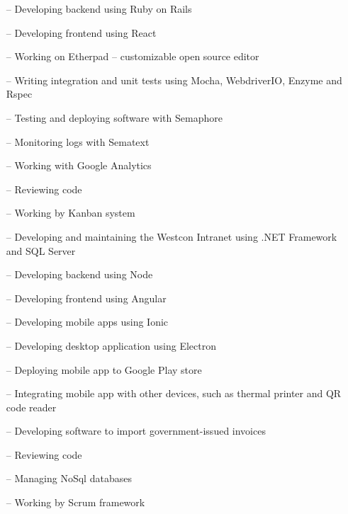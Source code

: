 \documentclass[12pt,a4paper]{altacv}
\begin{document}
\begin{paracol}{2} %



\medskip

\begin{itemize}
    \setlength{\itemindent}{1em}
    \item[--] {Developing backend using Ruby on Rails}
    \item[--] {Developing frontend using React}
    \item[--] {Working on Etherpad -- customizable open source editor}
    \item[--] {Writing integration and unit tests using Mocha, WebdriverIO, Enzyme and Rspec}
    \item[--] {Testing and deploying software with Semaphore}
    \item[--] {Monitoring logs with Sematext}
    \item[--] {Working with Google Analytics}
    \item[--] {Reviewing code}
    \item[--] {Working by Kanban system}
\end{itemize}

\medskip


\begin{itemize}
  \setlength{\itemindent}{1em}
\item[--] {Developing and maintaining the Westcon Intranet using .NET Framework and SQL Server}
\end{itemize}

\medskip


\begin{itemize}
  \setlength{\itemindent}{1em}
\item[--] {Developing backend using Node}
\item[--] {Developing frontend using Angular}
\item[--] {Developing mobile apps using Ionic}
\item[--] {Developing desktop application using Electron}
\item[--] {Deploying mobile app to Google Play store}
\item[--] {Integrating mobile app with other devices, such as thermal printer and QR code reader}
\item[--] {Developing software to import government-issued invoices}
\item[--] {Reviewing code}
\item[--] {Managing NoSql databases}
\item[--] {Working by Scrum framework}
\end{itemize}


\end{paracol}
\end{document}
